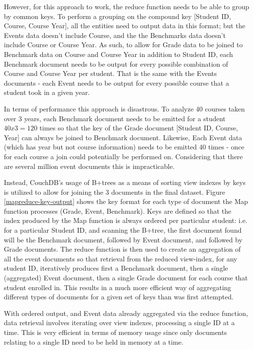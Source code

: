 However, for this approach to work, the reduce function needs to be able to group by common keys. To perform a grouping on the compound key [Student ID, Course, Course Year], all the entities need to output data in this format; but the Events data doesn't include Course, and the the Benchmarks data doesn't include Course or Course Year. As such, to allow for Grade data to be joined to Benchmark data on Course and Course Year in addition to Student ID, each Benchmark document needs to be output for every possible combination of Course and Course Year per student. That is the same with the Events documents - each Event needs to be output for every possible course that a student took in a given year.

In terms of performance this approach is disastrous. To analyze 40 courses taken over 3 years, each Benchmark document needs to be emitted for a student $40 x 3 = 120$ times so that the key of the Grade document [Student ID, Course, Year] can always be joined to Benchmark document. Likewise, Each Event data (which has year but not course information) needs to be emitted 40 times - once for each course a join could potentially be performed on. Considering that there are several million event documents this is impracticable.

Instead, CouchDB's usage of B+trees as a means of sorting view indexes by keys is utilized to allow for joining the 3 documents in the final dataset. Figure \ref{mapreduce-key-output} shows the key format for each type of document the Map function processes (Grade, Event, Benchmark). Keys are defined so that the index produced by the Map function is always ordered per particular student: i.e. for a particular Student ID, and scanning the B+tree, the first document found will be the Benchmark document, followed by Event document, and followed by Grade documents. The reduce function is then used to create an aggregation of all the event documents so that retrieval from the reduced view-index, for any student ID, iteratively produces first a Benchmark document, then a single (aggregated) Event document, then a single Grade document for each course that student enrolled in. This results in a much more efficient way of aggregating different types of documents for a given set of keys than was first attempted.

With ordered output, and Event data already aggregated via the reduce function, data retrieval involves iterating over view indexes, processing a single ID at a time. This is very efficient in terms of memory usage since only documents relating to a single ID need to be held in memory at a time.

